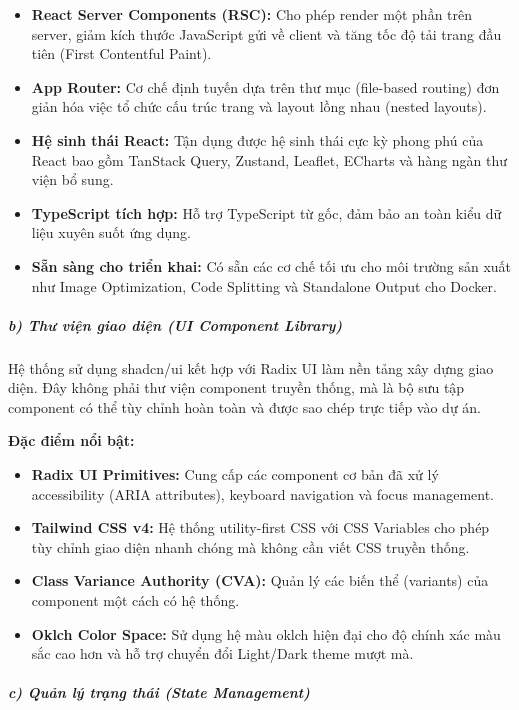 \documentclass[13pt,a4paper]{extarticle}
\renewcommand{\\}{\thesislongtableorignewline\hline}%
\providecommand{\tightlist}{%
  \setlength{\itemsep}{0pt}\setlength{\parskip}{0pt}}
\begin{document}
\begin{itemize}
\tightlist
\item
  \textbf{React Server Components (RSC):} Cho phép render một phần trên
  server, giảm kích thước JavaScript gửi về client và tăng tốc độ tải
  trang đầu tiên (First Contentful Paint).
\item
  \textbf{App Router:} Cơ chế định tuyến dựa trên thư mục (file-based
  routing) đơn giản hóa việc tổ chức cấu trúc trang và layout lồng nhau
  (nested layouts).
\item
  \textbf{Hệ sinh thái React:} Tận dụng được hệ sinh thái cực kỳ phong
  phú của React bao gồm TanStack Query, Zustand, Leaflet, ECharts và
  hàng ngàn thư viện bổ sung.
\item
  \textbf{TypeScript tích hợp:} Hỗ trợ TypeScript từ gốc, đảm bảo an
  toàn kiểu dữ liệu xuyên suốt ứng dụng.
\item
  \textbf{Sẵn sàng cho triển khai:} Có sẵn các cơ chế tối ưu cho môi
  trường sản xuất như Image Optimization, Code Splitting và Standalone
  Output cho Docker.
\end{itemize}

\subparagraph{b) Thư viện giao diện (UI Component
Library)}\label{b-thux1b0-viux1ec7n-giao-diux1ec7n-ui-component-library}

Hệ thống sử dụng shadcn/ui kết hợp với Radix UI làm nền tảng xây dựng
giao diện. Đây không phải thư viện component truyền thống, mà là bộ sưu
tập component có thể tùy chỉnh hoàn toàn và được sao chép trực tiếp vào
dự án.

\textbf{Đặc điểm nổi bật:}

\begin{itemize}
\tightlist
\item
  \textbf{Radix UI Primitives:} Cung cấp các component cơ bản đã xử lý
  accessibility (ARIA attributes), keyboard navigation và focus
  management.
\item
  \textbf{Tailwind CSS v4:} Hệ thống utility-first CSS với CSS Variables
  cho phép tùy chỉnh giao diện nhanh chóng mà không cần viết CSS truyền
  thống.
\item
  \textbf{Class Variance Authority (CVA):} Quản lý các biến thể
  (variants) của component một cách có hệ thống.
\item
  \textbf{Oklch Color Space:} Sử dụng hệ màu oklch hiện đại cho độ chính
  xác màu sắc cao hơn và hỗ trợ chuyển đổi Light/Dark theme mượt mà.
\end{itemize}

\subparagraph{c) Quản lý trạng thái (State
Management)}\label{c-quux1ea3n-luxfd-trux1ea1ng-thuxe1i-state-management}
\end{document}
